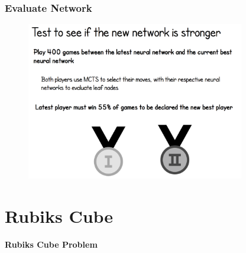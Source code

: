 \documentclass[notheorems, aspectratio=54]{beamer}
\begin{document}
\begin{frame}
    \frametitle{Evaluate Network}

    \begin{figure}
        \includegraphics[width=0.85\textwidth]{fig/evaluate_network.png}
    \end{figure}
\end{frame}

\section{Rubiks Cube}
\begin{frame}
    \center \huge \textbf{Rubiks Cube Problem}
\end{frame}
\end{document}
